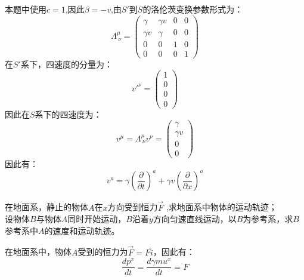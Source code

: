 \documentclass{assignment}
\begin{document}
    \begin{sol}
        本题中使用$c=1$,因此$\beta = -v$,由$S'$到$S$的洛伦茨变换参数形式为：
        \begin{equation}
            \Lambda^\mu_{\ \nu} = \left(
            \begin{array}{cccc}
                \gamma & \gamma v & 0 & 0 \\
                \gamma v & \gamma & 0 & 0 \\
                0 & 0 & 1 & 0 \\
                0 & 0 & 0 & 1
            \end{array}
            \right)
        \end{equation}
        在$S'$系下，四速度的分量为：
        \begin{equation}
            v'^\nu = \left( 
                \begin{array}{c}
                    1\\
                    0\\
                    0\\
                    0
                \end{array}
            \right)
        \end{equation}
        因此在$S$系下的四速度为：
        \begin{equation}
            v^\mu = \Lambda^\mu_{\ \nu}v^\nu = \left(
                \begin{array}{c}
                    \gamma\\
                    \gamma v\\
                    0\\
                    0
                \end{array}
            \right)
        \end{equation}
        因此有：
        \begin{equation}
            v^a =  \gamma (\frac{\partial}{\partial t})^a + \gamma v (\frac{\partial}{\partial x})^a
        \end{equation}
    \end{sol}
    \begin{prob}
        在地面系，静止的物体$A$在$x$方向受到恒力$\overrightarrow{F}$ ,求地面系中物体的运动轨迹；\\
        设物体$B$与物体$A$同时开始运动，$B$沿着$y$方向匀速直线运动，以$B$为参考系，求$B$参考系中$A$的速度和运动轨迹。
    \end{prob}
    \begin{sol}
        在地面系中，物体$A$受到的恒力为$\overrightarrow{F} = F\hat{i}$，因此有：
        \begin{equation}
            \frac{dp^x}{dt} = \frac{d \gamma m u^x}{dt} = F
        \end{equation}
    \end{sol}
\end{document}
